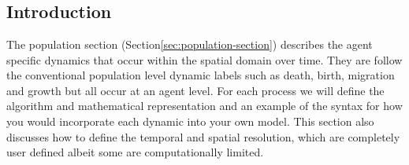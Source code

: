 \section{\label{sec:population-section}}

\subsection{Introduction}
The population section (Section\ref{sec:population-section}) describes the agent specific dynamics that occur within the spatial domain over time. They are follow the conventional population level dynamic labels such as death, birth, migration and growth but all occur at an agent level. For each process we will define the algorithm and mathematical representation and an example of the syntax for how you would incorporate each dynamic into your own model. This section also discusses how to define the temporal and spatial resolution, which are completely user defined albeit some are computationally limited.

